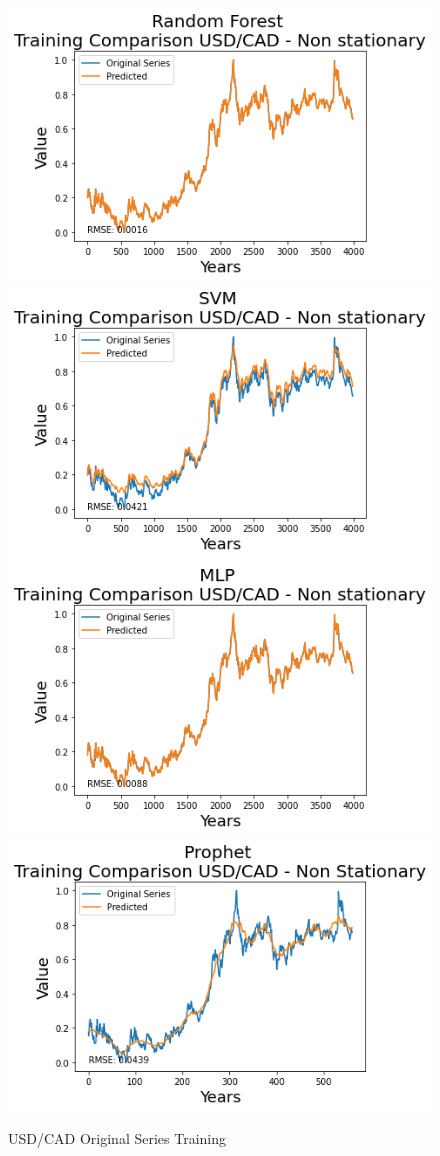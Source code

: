 \documentclass[10pt,twocolumn,letterpaper]{article}
\begin{document}
	\begin{figure}[h]
		\centering
		\includegraphics[width=0.45\linewidth]{../img/RandomForest/usd_cad_training}
		\includegraphics[width=0.45\linewidth]{../img/SVM/usd_cad_training}
		\includegraphics[width=0.45\linewidth]{../img/MLP/usd_cad_training}
		\includegraphics[width=0.45\linewidth]{../img/Prophet/usd_cad_training}
		\caption{USD/CAD Original Series Training}
		\label{fig:usd_cadtraining}
	\end{figure}
	
\end{document}
